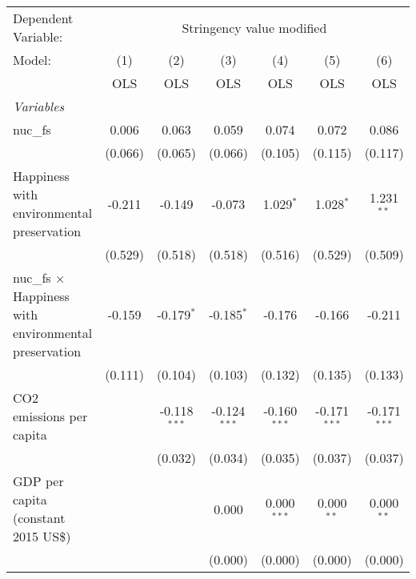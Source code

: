
\begingroup
\centering
\begin{tabular}{lcccccc}
   \toprule
   Dependent Variable: & \multicolumn{6}{c}{Stringency value modified}\\
   Model:                                                       & (1)     & (2)            & (3)            & (4)            & (5)            & (6)\\  
                                                                &  OLS    & OLS            & OLS            & OLS            & OLS            & OLS\\  
   \midrule
   \emph{Variables}\\
   nuc\_fs                                                      & 0.006   & 0.063          & 0.059          & 0.074          & 0.072          & 0.086\\   
                                                                & (0.066) & (0.065)        & (0.066)        & (0.105)        & (0.115)        & (0.117)\\   
   Happiness with environmental preservation                    & -0.211  & -0.149         & -0.073         & 1.029$^{*}$    & 1.028$^{*}$    & 1.231$^{**}$\\   
                                                                & (0.529) & (0.518)        & (0.518)        & (0.516)        & (0.529)        & (0.509)\\   
   nuc\_fs $\times$ Happiness with environmental preservation   & -0.159  & -0.179$^{*}$   & -0.185$^{*}$   & -0.176         & -0.166         & -0.211\\   
                                                                & (0.111) & (0.104)        & (0.103)        & (0.132)        & (0.135)        & (0.133)\\   
   CO2 emissions per capita                                     &         & -0.118$^{***}$ & -0.124$^{***}$ & -0.160$^{***}$ & -0.171$^{***}$ & -0.171$^{***}$\\   
                                                                &         & (0.032)        & (0.034)        & (0.035)        & (0.037)        & (0.037)\\   
   GDP per capita (constant 2015 US\$)                          &         &                & 0.000          & 0.000$^{***}$  & 0.000$^{**}$   & 0.000$^{**}$\\   
                                                                &         &                & (0.000)        & (0.000)        & (0.000)        & (0.000)\\   

\end{tabular}
